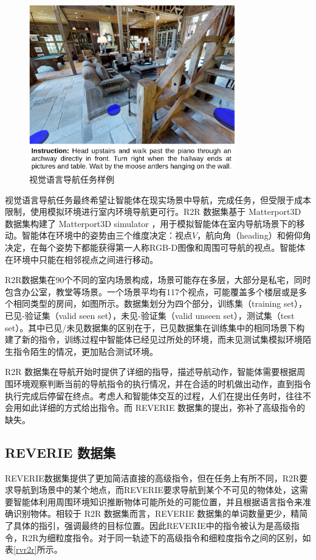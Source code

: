 \documentclass[bachelor]{thesis-uestc}
\begin{document}
\begin {figure}[h]
\centering %
\includegraphics[width=0.8\textwidth]{4556-042815.png}
\caption{视觉语言导航任务样例} %
\label{r2r}
\end {figure}

视觉语言导航任务最终希望让智能体在现实场景中导航，完成任务，但受限于成本限制，使用模拟环境进行室内环境导航更可行。R2R 数据集基于 Matterport3D 数据集构建了 Matterport3D simulator ，用于模拟智能体在室内导航场景下的移动。智能体在环境中的姿势由三个维度决定：视点$V$，航向角（heading）和俯仰角决定，在每个姿势下都能获得第一人称RGB-D图像和周围可导航的视点。智能体在环境中只能在相邻视点之间进行移动。

R2R数据集在90个不同的室内场景构成，场景可能存在多层，大部分是私宅，同时包含办公室，教堂等场景。一个场景平均有117个视点，可能覆盖多个楼层或是多个相同类型的房间，如图所示。数据集划分为四个部分，训练集（training set），已见-验证集（valid seen set），未见-验证集（valid unseen set），测试集（test set）。其中已见/未见数据集的区别在于，已见数据集在训练集中的相同场景下构建了新的指令，训练过程中智能体已经见过所处的环境，而未见测试集模拟环境陌生指令陌生的情况，更加贴合测试环境。


R2R 数据集在导航开始时提供了详细的指导，描述导航动作，智能体需要根据周围环境观察判断当前的导航指令的执行情况，并在合适的时机做出动作，直到指令执行完成后停留在终点。考虑人和智能体交互的过程，人们在提出任务时，往往不会用如此详细的方式给出指令。而 REVERIE 数据集的提出，弥补了高级指令的缺失。

\subsection{REVERIE 数据集}
REVERIE数据集提供了更加简洁直接的高级指令，但在任务上有所不同，R2R要求导航到场景中的某个地点，而REVERIE要求导航到某个不可见的物体处，这需要智能体利用周围环境知识推断物体可能所处的可能位置，并且根据语言指令来准确识别物体。相较于 R2R 数据集而言，REVERIE 数据集的单词数量更少，精简了具体的指引，强调最终的目标位置。因此REVERIE中的指令被认为是高级指令，R2R为细粒度指令。对于同一轨迹下的高级指令和细粒度指令之间的区别，如表\ref{rvr2r}所示。
\end{document}
